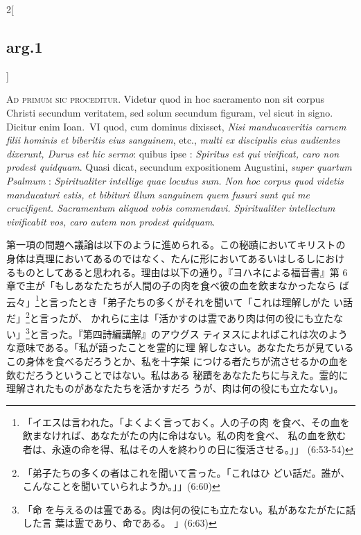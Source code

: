 \documentclass[paper=a4paper,fontsize=10pt,jafontsize=9pt,titlepage]{jlreq}
\begin{document}
\begin{paracol}{2}[\subsection{arg.1}]

{\scshape Ad primum sic proceditur}. Videtur quod in hoc sacramento
non sit corpus Christi secundum veritatem, sed solum secundum figuram,
vel sicut in signo. Dicitur enim Ioan.~{\scshape VI} quod, cum dominus
dixisset, {\itshape Nisi manducaveritis carnem filii hominis et
biberitis eius sanguinem}, etc., {\itshape multi ex discipulis eius
audientes dixerunt, Durus est hic sermo}: quibus ipse : {\itshape
Spiritus est qui vivificat, caro non prodest quidquam}. Quasi dicat,
secundum expositionem Augustini, {\itshape super quartum Psalmum} :
{\itshape Spiritualiter intellige quae locutus sum. Non hoc corpus
quod videtis manducaturi estis, et bibituri illum sanguinem quem
fusuri sunt qui me crucifigent. Sacramentum aliquod vobis
commendavi. Spiritualiter intellectum vivificabit vos, caro autem non
prodest quidquam}.

\switchcolumn

第一項の問題へ議論は以下のように進められる。この秘蹟においてキリストの
身体は真理においてあるのではなく、たんに形においてあるいはしるしにおけ
るものとしてあると思われる。理由は以下の通り。『ヨハネによる福音書』第
6章で主が「もしあなたたちが人間の子の肉を食べ彼の血を飲まなかったなら
ば云々」\footnote{「イエスは言われた。「よくよく言っておく。人の子の肉
を食べ、その血を飲まなければ、あなたがたの内に命はない。私の肉を食べ、
私の血を飲む者は、永遠の命を得、私はその人を終わりの日に復活させる。」」
(6:53-54)}と言ったとき「弟子たちの多くがそれを聞いて「これは理解しがた
い話だ」\footnote{「弟子たちの多くの者はこれを聞いて言った。「これはひ
どい話だ。誰が、こんなことを聞いていられようか。」」(6:60)}と言ったが、
かれらに主は「活かすのは霊であり肉は何の役にも立たない」\footnote{「命
を与えるのは霊である。肉は何の役にも立たない。私があなたがたに話した言
葉は霊であり、命である。 」(6:63)}と言った。『第四詩編講解』のアウグス
ティヌスによればこれは次のような意味である。「私が語ったことを霊的に理
解しなさい。あなたたちが見ているこの身体を食べるだろうとか、私を十字架
につける者たちが流させるかの血を飲むだろうということではない。私はある
秘蹟をあなたたちに与えた。霊的に理解されたものがあなたたちを活かすだろ
うが、肉は何の役にも立たない」。



\end{paracol}
\end{document}
